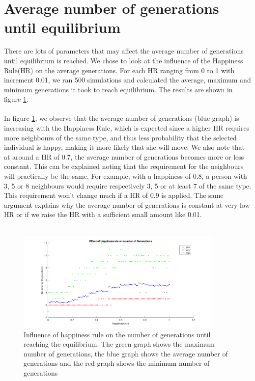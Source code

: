 
\section{Average number of generations until equilibrium}
There are lots of parameters that may affect the average number of generations until  equilibrium is reached. We chose to look at the influence of the Happiness Rule(HR) on the average generations. For each HR ranging from 0 to 1 with increment 0.01, we ran 500 simulations and calculated the average, maximum and minimum generations it took to reach equilibrium. The results are shown in figure \ref{fig:avegen}.\\
\\
In figure \ref{fig:avegen}, we observe that the average number of generations (blue graph) is increasing with the Happiness Rule, which is expected since a higher HR requires more neighbours of the same type, and thus less probability that the selected individual is happy, making it more likely that she will move. We also note that at around a HR of 0.7, the average number of generations becomes more or less constant. This can be explained noting that the requirement for the neighbours will practically be the same. For example, with a happiness of 0.8, a person with 3, 5 or 8 neighbours would require respectively 3, 5 or at least 7 of the same type. This requirement won't change much if a HR of 0.9 is applied. The same argument explains why the average number of generations is constant at very low HR or if we raise the HR with a sufficient small amount like 0.01.\\
\\
\begin{figure}[h!]
    \centering
    \includegraphics[width=0.9\textwidth]{happinessregel_aantgen_2.pdf}
    \caption{Influence of happiness rule on the number of generations until reaching the equilibrium. The green graph shows the maximum number of generations, the blue graph shows the average number of generations and the red graph shows the minimum number of generations}
    \label{fig:avegen}
\end{figure}
